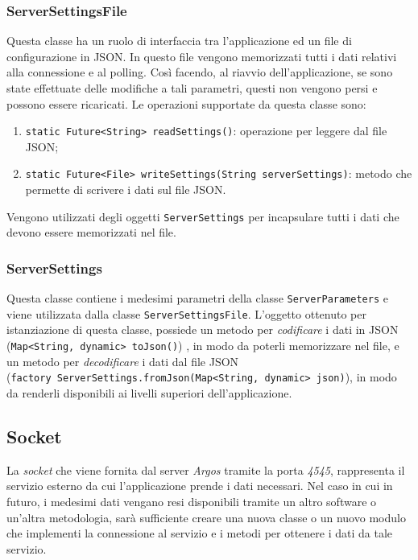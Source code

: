\subsubsection{ServerSettingsFile}
Questa classe ha un ruolo di interfaccia tra l'applicazione ed un file di configurazione in JSON. In questo file vengono memorizzati tutti i dati relativi alla connessione e al polling. Così facendo, al riavvio dell'applicazione, se sono state effettuate delle modifiche a tali parametri, questi non vengono persi e possono essere ricaricati.
Le operazioni supportate da questa classe sono:
\begin{enumerate}
	\item \verb|static Future<String> readSettings()|: operazione per leggere dal file JSON;
	\item \verb|static Future<File> writeSettings(String serverSettings)|: metodo che permette di scrivere i dati sul file JSON.
\end{enumerate}

Vengono utilizzati degli oggetti \verb|ServerSettings| per incapsulare tutti i dati che devono essere memorizzati nel file.

\subsubsection{ServerSettings}
Questa classe contiene i medesimi parametri della classe \verb|ServerParameters| e viene utilizzata dalla classe \verb|ServerSettingsFile|. L'oggetto ottenuto per istanziazione di questa classe, possiede un metodo per \textit{codificare} i dati in JSON (\verb|Map<String, dynamic> toJson()|) , in modo da poterli memorizzare nel file, e un metodo per \textit{decodificare} i dati dal file JSON \\(\verb|factory ServerSettings.fromJson(Map<String, dynamic> json)|), in modo da renderli disponibili ai livelli superiori dell'applicazione.

\subsection{Socket}
La \textit{socket} che viene fornita dal server \textit{Argos} tramite la porta \textit{4545}, rappresenta il servizio esterno da cui l'applicazione prende i dati necessari. Nel caso in cui in futuro, i medesimi dati vengano resi disponibili tramite un altro software o un'altra metodologia, sarà sufficiente creare una nuova classe o un nuovo modulo che implementi la connessione al servizio e i metodi per ottenere i dati da tale servizio.

